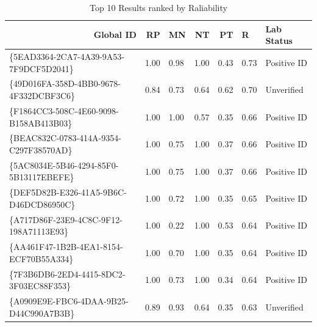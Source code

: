 \documentclass[13pt]{ctexart}
\begin{document}
\begin{table}[h]
	\begin{tabular}{lllllll}
		\hline
		\multicolumn{1}{r}{\textbf{Global ID}}   & \multicolumn{1}{r}{RP} & \multicolumn{1}{r}{MN} & \multicolumn{1}{r}{NT} & \multicolumn{1}{r}{PT} & R    & Lab Status  \\ \hline
		\{5EAD3364-2CA7-4A39-9A53-7F9DCF5D2041\} & 1.00                   & 0.98                   & 1.00                   & 0.43                   & 0.73 & Positive ID \\
		\{49D016FA-358D-4BB0-9678-4F332DCBF3C6\} & 0.84                   & 0.73                   & 0.64                   & 0.62                   & 0.70 & Unverified  \\
		\{F1864CC3-508C-4E60-9098-B158AB413B03\} & 1.00                   & 1.00                   & 0.57                   & 0.35                   & 0.66 & Positive ID \\
		\{BEAC832C-0783-414A-9354-C297F38570AD\} & 1.00                   & 0.75                   & 1.00                   & 0.37                   & 0.66 & Positive ID \\
		\{5AC8034E-5B46-4294-85F0-5B13117EBEFE\} & 1.00                   & 0.75                   & 1.00                   & 0.37                   & 0.66 & Positive ID \\
		\{DEF5D82B-E326-41A5-9B6C-D46DCD86950C\} & 1.00                   & 0.72                   & 1.00                   & 0.35                   & 0.65 & Positive ID \\
		\{A717D86F-23E9-4C8C-9F12-198A71113E93\} & 1.00                   & 0.22                   & 1.00                   & 0.53                   & 0.64 & Positive ID \\
		\{AA461F47-1B2B-4EA1-8154-ECF70B55A334\} & 1.00                   & 0.70                   & 1.00                   & 0.35                   & 0.64 & Positive ID \\
		\{7F3B6DB6-2ED4-4415-8DC2-3F03EC88F353\} & 1.00                   & 0.73                   & 1.00                   & 0.34                   & 0.64 & Positive ID \\
		\{A0909E9E-FBC6-4DAA-9B25-D44C990A7B3B\} & 0.89                   & 0.93                   & 0.64                   & 0.35                   & 0.63 & Unverified  \\ \hline
	\end{tabular}
	\caption{Top 10 Results ranked by Raliability}
\end{table}
\end{document}
